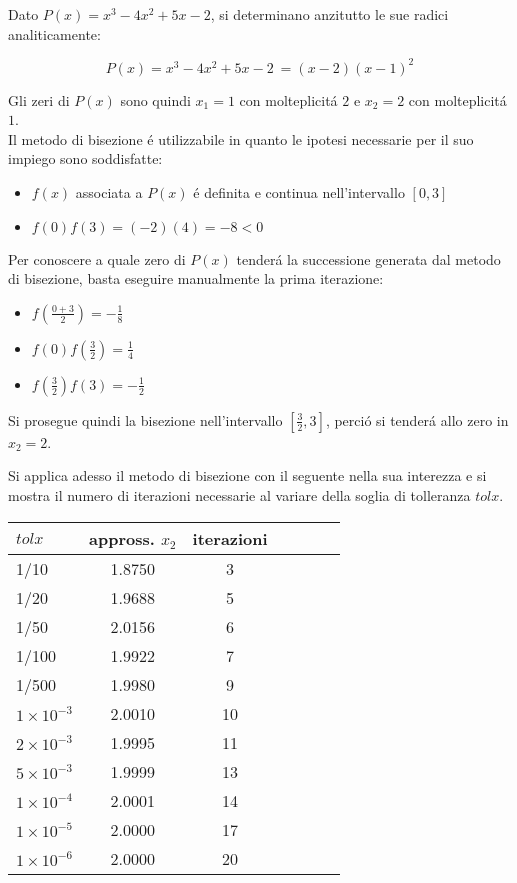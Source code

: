 Dato \(P(x) = x^3 - 4x^2 + 5x - 2\), si determinano anzitutto le sue radici analiticamente:

\[
P(x) = x^3 - 4x^2 + 5x - 2\ = (x-2)(x-1)^2
\]

\noindent Gli zeri di \(P(x)\) sono quindi \(x_1=1\) con molteplicit\'a \(2\) e \(x_2=2\) con molteplicit\'a \(1\).\\

\noindent Il metodo di bisezione \'e utilizzabile in quanto le ipotesi necessarie per il suo impiego sono soddisfatte:

\begin{itemize}

\item \(f(x)\) associata a \(P(x)\) \'e definita e continua nell'intervallo \([0,3]\)
\item \(f(0)f(3) = (-2)(4) = -8 < 0\)

\end{itemize}

\noindent Per conoscere a quale zero di \(P(x)\) tender\'a la successione generata dal metodo di bisezione, basta eseguire manualmente la prima iterazione:

\begin{itemize}
\item \(f(\frac{0+3}{2}) = -\frac{1}{8}\)
\item \(f(0)f(\frac{3}{2}) = \frac{1}{4}\)
\item \(f(\frac{3}{2})f(3) = -\frac{1}{2}\)
\end{itemize}

\noindent Si prosegue quindi la bisezione nell'intervallo \([\frac{3}{2}, 3]\), perci\'o si tender\'a allo zero in \(x_2=2\).

\noindent Si applica adesso il metodo di bisezione con il seguente nella sua interezza e si mostra il numero di iterazioni necessarie al variare della soglia di tolleranza \(tolx\).\\

\begin{tabular}{l*{6}{c}}
 \(tolx\) & appross. \(x_2\) & iterazioni \\
\hline
 1/10 & 1.8750 & 3\\
 1/20 & 1.9688 & 5\\
 1/50 & 2.0156 & 6\\
 1/100 & 1.9922 & 7\\
 1/500 & 1.9980 & 9\\
 \(1 \times 10^{-3}\) & 2.0010 & 10\\
 \(2 \times 10^{-3}\) & 1.9995 & 11\\
 \(5 \times 10^{-3}\) & 1.9999 & 13\\
 \(1 \times 10^{-4}\) & 2.0001 & 14\\
 \(1 \times 10^{-5}\) & 2.0000 & 17\\
 \(1 \times 10^{-6}\) & 2.0000 & 20\\
\end{tabular} \\

